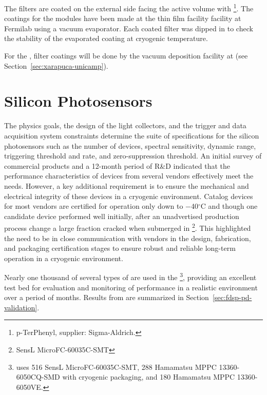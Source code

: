 The filters are coated on the external side facing the \lar active volume with \footnote{p-TerPhenyl, supplier: Sigma-Aldrich\textregistered.}.  The coatings for the  modules have been made at the thin film facility facility at Fermilab using a vacuum evaporator. Each coated filter was dipped in  to check the stability of the evaporated coating at cryogenic temperature. 

For the , filter coatings will be done by the vacuum deposition facility at  (see Section~\ref{sec:xarapuca-unicamp}).

\section{Silicon Photosensors}
\label{sec:fdsp-pd-ps}

The physics goals, the design of the light collectors, and the trigger and data acquisition system constraints determine the suite of specifications for the silicon photosensors such as the number of devices, spectral sensitivity, dynamic range, triggering threshold and rate, and zero-suppression threshold. An initial survey of commercial products and a 12-month period of R\&D indicated that the performance characteristics of devices from several vendors effectively meet the  needs. 
However, a key additional requirement is to ensure the mechanical and electrical integrity of these devices in a cryogenic environment. Catalog devices for most vendors are certified for operation only down to \num{-40}$^\circ$C and though one candidate device performed well initially, after an unadvertised production process change a large fraction cracked when submerged in \footnote{SensL MicroFC-60035C-SMT}. This highlighted the need to be in close communication with vendors in the 
 design, fabrication, and packaging certification stages to ensure 
robust and reliable long-term operation in a cryogenic environment. 

Nearly one thousand of several types of  are used in the  \footnote{  uses 516 SensL MicroFC-60035C-SMT, 288 Hamamatsu MPPC 13360-6050CQ-SMD with cryogenic packaging, and 180 Hamamatsu MPPC 13360-6050VE.}, providing an excellent test bed for evaluation and monitoring of  performance in a realistic environment over a period of months. Results from  are summarized in Section~\ref{sec:fdsp-pd-validation}.

